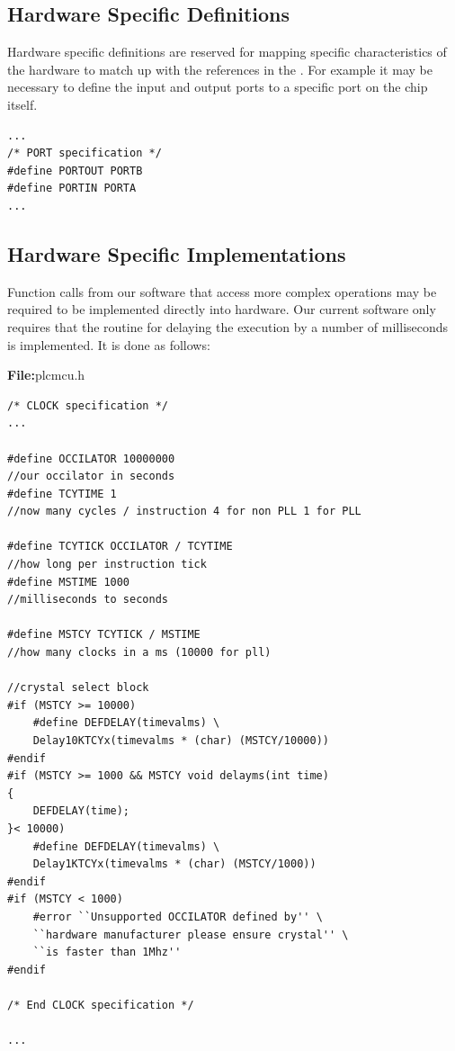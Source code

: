 \subsection{Hardware Specific Definitions}

Hardware specific definitions are reserved for mapping specific characteristics 
of the hardware to match up with the references in the . 
For example it may be necessary to define the input and output ports to a specific port on the chip itself.



\begin{lstlisting}[frame=single]
...
/* PORT specification */
#define PORTOUT PORTB
#define PORTIN PORTA
...
\end{lstlisting}



\subsection{Hardware Specific Implementations}

Function calls from our software that access more complex operations 
may be required to be implemented directly into hardware. Our current 
software only requires that the routine for delaying the execution by a 
number of milliseconds is implemented. It is done as follows:

\textbf{File:}plcmcu.h



\begin{lstlisting}[frame=single]
/* CLOCK specification */
...

#define OCCILATOR 10000000 
//our occilator in seconds
#define TCYTIME 1 
//now many cycles / instruction 4 for non PLL 1 for PLL 

#define TCYTICK OCCILATOR / TCYTIME 
//how long per instruction tick
#define MSTIME 1000 
//milliseconds to seconds

#define MSTCY TCYTICK / MSTIME 
//how many clocks in a ms (10000 for pll)

//crystal select block
#if (MSTCY >= 10000)
	#define DEFDELAY(timevalms) \
	Delay10KTCYx(timevalms * (char) (MSTCY/10000))
#endif
#if (MSTCY >= 1000 && MSTCY void delayms(int time)
{
	DEFDELAY(time);
}< 10000)
	#define DEFDELAY(timevalms) \ 
	Delay1KTCYx(timevalms * (char) (MSTCY/1000))
#endif
#if (MSTCY < 1000)
	#error ``Unsupported OCCILATOR defined by'' \
	``hardware manufacturer please ensure crystal'' \
	``is faster than 1Mhz''
#endif

/* End CLOCK specification */

...
\end{lstlisting}




